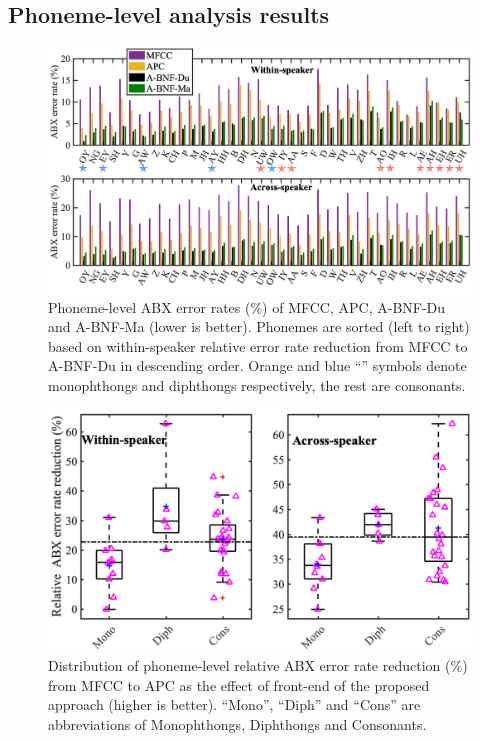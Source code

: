 \documentclass[transmag]{IEEEtran}
\begin{document}
\subsection{Phoneme-level analysis results}
\label{subsec:analysis_on_results_phoneme_level}
\begin{figure}[!t]
    \centering
    \includegraphics[width= \linewidth]{per_phoneme_abx_sorted_by_rel_ER_reduction_adjust_journal_w_star_fixed.png}
    \caption{Phoneme-level ABX error rates ($\%$) of MFCC, APC, A-BNF-Du and A-BNF-Ma (lower is better). Phonemes are sorted (left to right) based on within-speaker relative error rate reduction from MFCC to A-BNF-Du in  descending order. Orange and blue  ``'' symbols denote monophthongs and diphthongs respectively, the rest are consonants. }
    \label{fig:analyses_per_phone_bar}
\end{figure}
\begin{figure}[!t]
    \centering
    \includegraphics[width= \linewidth]{boxplot_per_phoneme_abx_mfcc_to_apc_triangle_adjust_journal.png}
    \caption{Distribution of phoneme-level relative ABX error rate reduction ($\%$) from MFCC to APC as the effect of front-end of the proposed approach (higher is better).  ``Mono'', ``Diph'' and ``Cons'' are abbreviations of Monophthongs, Diphthongs and Consonants.}
    \label{fig:analyses_per_phone_mfcc_to_apc_boxplot}
\end{figure}
\end{document}
